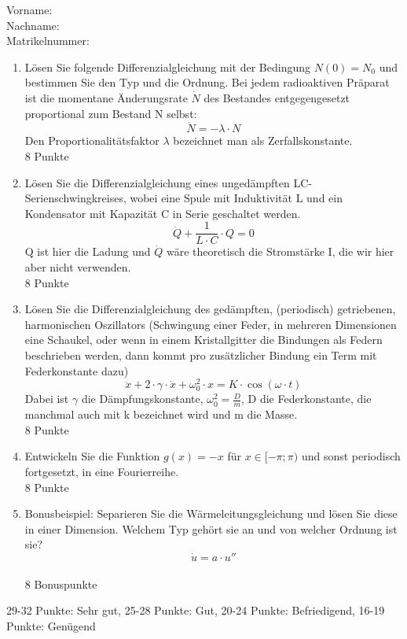 \documentclass[fleqn]{article}
\begin{document}
Vorname:\\
Nachname:\\
Matrikelnummer:\\
\begin{enumerate}
  \item L\"osen Sie folgende Differenzialgleichung mit der Bedingung $N(0)=N_0$ und bestimmen Sie den Typ und die Ordnung. Bei jedem radioaktiven Pr\"aparat ist die momentane \"Anderungsrate $\dot{N}$ des Bestandes entgegengesetzt proportional zum Bestand N selbst:
    \begin{equation}
      \dot{N}=-\lambda\cdot N
    \end{equation}
  Den Proportionalit\"atsfaktor $\lambda$ bezeichnet man als Zerfallskonstante.
  \\8 Punkte
\item L\"osen Sie die Differenzialgleichung eines unged\"ampften LC-Serienschwingkreises, wobei eine Spule mit Induktivit\"at L und ein Kondensator mit Kapazit\"at C in Serie geschaltet werden.
  \begin{equation}
    \ddot{Q}+\frac{1}{L\cdot C}\cdot Q = 0
  \end{equation}
  Q ist hier die Ladung und $\dot{Q}$ w\"are theoretisch die Stromst\"arke I, die wir hier aber nicht verwenden.
 \\ 8 Punkte
\item L\"osen Sie die Differenzialgleichung des ged\"ampften, (periodisch) getriebenen, harmonischen Oszillators (Schwingung einer Feder, in mehreren Dimensionen eine Schaukel, oder wenn in einem Kristallgitter die Bindungen als Federn beschrieben werden, dann kommt pro zus\"atzlicher Bindung ein Term mit Federkonstante dazu)
  \begin{equation}
    \ddot{x}+2\cdot\gamma\cdot\dot{x}+\omega_0^2\cdot x = K\cdot \cos(\omega\cdot t)
  \end{equation}
    Dabei ist $\gamma$ die D\"ampfungskonstante, $\omega_0^2=\frac{D}{m}$, D die Federkonstante, die manchmal auch mit k bezeichnet wird und m die Masse.
  \\8 Punkte
\item Entwickeln Sie die Funktion $g(x)=-x$ f\"ur $x \in [-\pi;\pi)$ und sonst periodisch fortgesetzt, in eine Fourierreihe.
  \\8 Punkte
\item Bonusbeispiel: Separieren Sie die W\"armeleitungsgleichung und l\"osen Sie diese in einer Dimension. Welchem Typ geh\"ort sie an und von welcher Ordnung ist sie?
  \begin{equation}
    \dot{u} = a\cdot u''
  \end{equation}
  \\8 Bonuspunkte
\end{enumerate}
29-32 Punkte: Sehr gut, 25-28 Punkte: Gut, 20-24 Punkte: Befriedigend, 16-19 Punkte: Gen\"ugend
\end{document}
